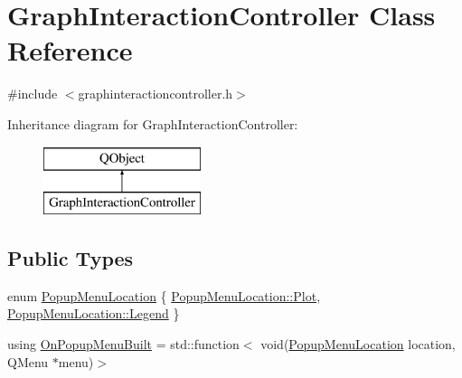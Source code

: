 \hypertarget{class_graph_interaction_controller}{}\section{Graph\+Interaction\+Controller Class Reference}
\label{class_graph_interaction_controller}


{\ttfamily \#include $<$graphinteractioncontroller.\+h$>$}

Inheritance diagram for Graph\+Interaction\+Controller\+:\begin{figure}[H]
\begin{center}
\leavevmode
\includegraphics[height=2.000000cm]{d2/d40/class_graph_interaction_controller}
\end{center}
\end{figure}
\subsection*{Public Types}
\begin{DoxyCompactItemize}
\item 
enum \mbox{\hyperlink{class_graph_interaction_controller_a67e6eba082927bf2b984bed54fe32764}{Popup\+Menu\+Location}} \{ \mbox{\hyperlink{class_graph_interaction_controller_a67e6eba082927bf2b984bed54fe32764a36be98b843e778a6e7350354b6937cfe}{Popup\+Menu\+Location\+::\+Plot}}, 
\mbox{\hyperlink{class_graph_interaction_controller_a67e6eba082927bf2b984bed54fe32764a9b27e12d584b3438e811533b32e026e8}{Popup\+Menu\+Location\+::\+Legend}}
 \}
\item 
using \mbox{\hyperlink{class_graph_interaction_controller_a9781ca3edf7c9c5cf3ad12c3496cf24c}{On\+Popup\+Menu\+Built}} = std\+::function$<$ void(\mbox{\hyperlink{class_graph_interaction_controller_a67e6eba082927bf2b984bed54fe32764}{Popup\+Menu\+Location}} location, Q\+Menu $\ast$menu)$>$
\end{DoxyCompactItemize}
